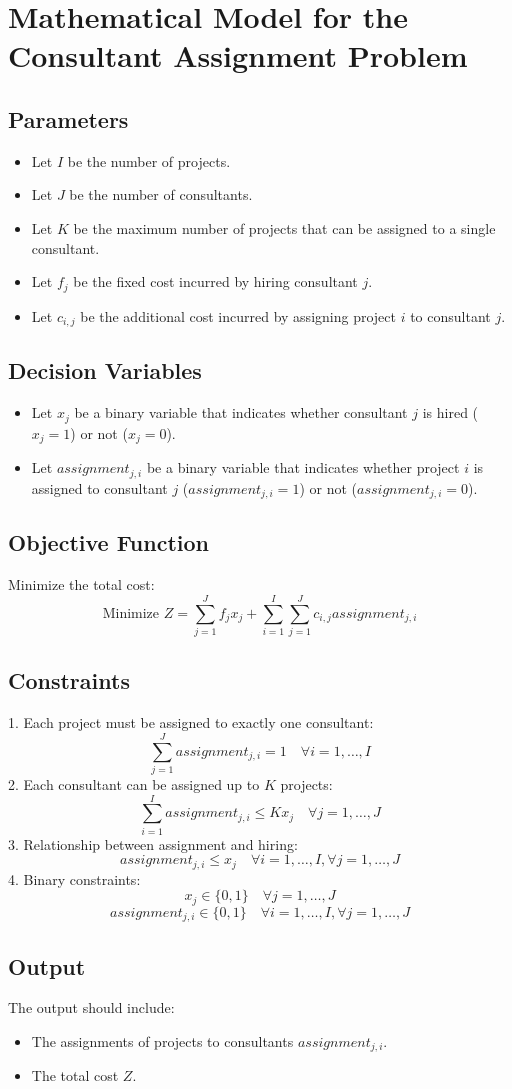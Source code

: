 \documentclass{article}
\begin{document}
\section*{Mathematical Model for the Consultant Assignment Problem}

\subsection*{Parameters}
\begin{itemize}
    \item Let \( I \) be the number of projects.
    \item Let \( J \) be the number of consultants.
    \item Let \( K \) be the maximum number of projects that can be assigned to a single consultant.
    \item Let \( f_j \) be the fixed cost incurred by hiring consultant \( j \).
    \item Let \( c_{i,j} \) be the additional cost incurred by assigning project \( i \) to consultant \( j \).
\end{itemize}

\subsection*{Decision Variables}
\begin{itemize}
    \item Let \( x_{j} \) be a binary variable that indicates whether consultant \( j \) is hired (\( x_{j} = 1 \)) or not (\( x_{j} = 0 \)).
    \item Let \( assignment_{j,i} \) be a binary variable that indicates whether project \( i \) is assigned to consultant \( j \) (\( assignment_{j,i} = 1 \)) or not (\( assignment_{j,i} = 0 \)).
\end{itemize}

\subsection*{Objective Function}
Minimize the total cost:
\[
\text{Minimize } Z = \sum_{j=1}^{J} f_j x_j + \sum_{i=1}^{I} \sum_{j=1}^{J} c_{i,j} assignment_{j,i}
\]

\subsection*{Constraints}
1. Each project must be assigned to exactly one consultant:
\[
\sum_{j=1}^{J} assignment_{j,i} = 1 \quad \forall i = 1, \ldots, I
\]
2. Each consultant can be assigned up to \( K \) projects:
\[
\sum_{i=1}^{I} assignment_{j,i} \leq K x_j \quad \forall j = 1, \ldots, J
\]
3. Relationship between assignment and hiring:
\[
assignment_{j,i} \leq x_j \quad \forall i = 1, \ldots, I, \forall j = 1, \ldots, J
\]
4. Binary constraints:
\[
x_j \in \{0, 1\} \quad \forall j = 1, \ldots, J
\]
\[
assignment_{j,i} \in \{0, 1\} \quad \forall i = 1, \ldots, I, \forall j = 1, \ldots, J
\]

\subsection*{Output}
The output should include:
\begin{itemize}
    \item The assignments of projects to consultants \( assignment_{j,i} \).
    \item The total cost \( Z \).
\end{itemize}
\end{document}
